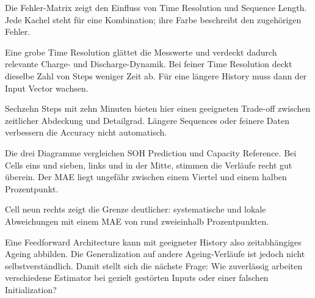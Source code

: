 
\begin{sprechtext}

Die Fehler-Matrix zeigt den Einfluss von Time Resolution und Sequence Length. Jede Kachel steht für eine Kombination; ihre Farbe beschreibt den zugehörigen Fehler.

Eine grobe Time Resolution glättet die Messwerte und verdeckt dadurch relevante Charge- und Discharge-Dynamik. Bei feiner Time Resolution deckt dieselbe Zahl von Steps weniger Zeit ab. Für eine längere History muss dann der Input Vector wachsen.

Sechzehn Steps mit zehn Minuten bieten hier einen geeigneten Trade-off zwischen zeitlicher Abdeckung und Detailgrad. Längere Sequences oder feinere Daten verbessern die Accuracy nicht automatisch.

\end{sprechtext}


\begin{sprechtext}

Die drei Diagramme vergleichen SOH Prediction und Capacity Reference. Bei Cells eins und sieben, links und in der Mitte, stimmen die Verläufe recht gut überein. Der MAE liegt ungefähr zwischen einem Viertel und einem halben Prozentpunkt.

Cell neun rechts zeigt die Grenze deutlicher: systematische und lokale Abweichungen mit einem MAE von rund zweieinhalb Prozentpunkten.

Eine Feedforward Architecture kann mit geeigneter History also zeitabhängiges Ageing abbilden. Die Generalization auf andere Ageing-Verläufe ist jedoch nicht selbstverständlich. Damit stellt sich die nächste Frage: Wie zuverlässig arbeiten verschiedene Estimator bei gezielt gestörten Inputs oder einer falschen Initialization?

\end{sprechtext}
